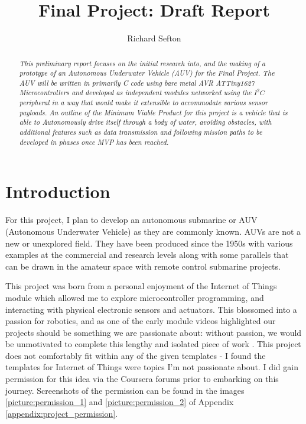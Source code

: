 \documentclass[11pt,a4paper,titlepage]{report}
\title{Final Project: Draft Report}
\author{Richard Sefton}
\date{}
\begin{document}
	\maketitle	
	\tableofcontents
	
	\begin{abstract}
		\textit{
			This preliminary report focuses on the initial research into, and the making of a prototype of an Autonomous Underwater Vehicle (AUV) for the Final Project. The AUV will be written in primarily C code using bare metal AVR ATTiny1627 Microcontrollers and developed as independent modules networked using the $I^{2}C$ peripheral in a way that would make it extensible to accommodate various sensor payloads. An outline of the Minimum Viable Product for this project is a vehicle that is able to Autonomously drive itself through a body of water, avoiding obstacles, with additional features such as data transmission and following mission paths to be developed in phases once MVP has been reached.
		}
	\end{abstract}
	
	\chapter*{Introduction}
	
	For this project, I plan to develop an autonomous submarine or AUV (Autonomous Underwater Vehicle) as they are commonly known. AUVs are not a new or unexplored field. They have been produced since the 1950s with various examples at the commercial and research levels along with some parallels that can be drawn in the amateur space with remote control submarine projects. 
	
	This project was born from a personal enjoyment of the Internet of Things module which allowed me to explore microcontroller programming, and interacting with physical electronic sensors and actuators. This blossomed into a passion for robotics, and as one of the early module videos highlighted our projects should be something we are passionate about: without passion, we would be unmotivated to complete this lengthy and isolated piece of work \cite{COURSERA_PROJECT_VIDEO}. This project does not comfortably fit within any of the given templates - I found the templates for Internet of Things were topics I'm not passionate about. I did gain permission for this idea via the Coursera forums\cite{COURSERA_PROJECT_PERMISSION} prior to embarking on this journey. Screenshots of the permission can be found in the images \ref{picture:permission_1} and \ref{picture:permission_2} of Appendix \ref{appendix:project_permission}.
\end{document}

